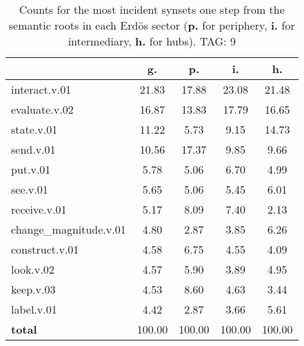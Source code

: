 \begin{table}[h!]
\begin{center}
\begin{tabular}{| l | c | c | c | c |}\hline
 & g. & p. & i. & h. \\\hline
interact.v.01 & 21.83  & 17.88  & 23.08  & 21.48 \\\hline
evaluate.v.02 & 16.87  & 13.83  & 17.79  & 16.65 \\\hline
state.v.01 & 11.22  & 5.73  & 9.15  & 14.73 \\\hline
send.v.01 & 10.56  & 17.37  & 9.85  & 9.66 \\\hline
put.v.01 & 5.78  & 5.06  & 6.70  & 4.99 \\\hline
see.v.01 & 5.65  & 5.06  & 5.45  & 6.01 \\\hline
receive.v.01 & 5.17  & 8.09  & 7.40  & 2.13 \\\hline
change\_magnitude.v.01 & 4.80  & 2.87  & 3.85  & 6.26 \\\hline
construct.v.01 & 4.58  & 6.75  & 4.55  & 4.09 \\\hline
look.v.02 & 4.57  & 5.90  & 3.89  & 4.95 \\\hline
keep.v.03 & 4.53  & 8.60  & 4.63  & 3.44 \\\hline
label.v.01 & 4.42  & 2.87  & 3.66  & 5.61 \\\hline
{{\bf total}} & 100.00  & 100.00  & 100.00  & 100.00 \\\hline
\end{tabular}
\caption{Counts for the most incident synsets one step from the semantic roots in each Erd\"os sector ({\bf p.} for periphery, {\bf i.} for intermediary, {\bf h.} for hubs). TAG: 9}
\end{center}
\end{table}